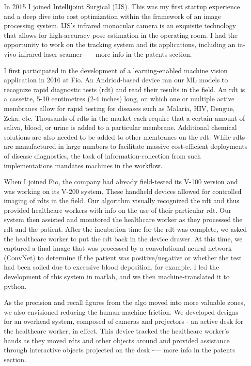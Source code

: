 \osspacing
In 2015 I joined Intellijoint Surgical (IJS). This was my first startup experience and a deep dive into cost optimization within the framework of an image processing system. IJS’s infrared monocular camera is an exquisite technology that allows for high-accuracy pose estimation in the operating room. I had the opportunity to work on the tracking system and its applications, including an in-vivo infrared laser scanner -— more info in the patents section.

\osspacing
I first participated in the development of a learning-enabled machine vision application in 2016 at Fio. An Andriod-based device ran our ML models to recognize rapid diagnostic tests (rdt) and read their results in the field. An rdt is a cassette, 5-10 centimetres (2-4 inches) long, on which one or multiple active membranes allow for rapid testing for diseases such as Malaria, HIV, Dengue, Zeka, etc. Thousands of rdts in the market each require that a certain amount of saliva, blood, or urine is added to a particular membrane. Additional chemical solutions are also needed to be added to other membranes on the rdt. While rdts are manufactured in large numbers to facilitate massive cost-efficient deployments of disease diagnostics, the task of information-collection from such implementations mandates machines in the workflow.

\osspacing
When I joined Fio, the company had already field-tested its V-100 version and was working on its V-200 system. These handheld devices allowed for controlled imaging of rdts in the field. Our algorithm visually recognized the rdt and thus provided healthcare workers with info on the use of their particular rdt. Our system then assisted and monitored the healthcare worker as they processed the rdt and the patient. After the incubation time for the rdt was complete, we asked the healthcare worker to put the rdt back in the device drawer. At this time, we captured a final image that was processed by a convolutional neural network (ConvNet) to determine if the patient was positive/negative or whether the test had been soiled due to excessive blood deposition, for example. I led the development of this system in matlab, and we then machine-translated it to python.
 
\osspacing
As the precision and recall figures from the algo moved into more valuable zones, we also envisioned reducing the human-machine friction. We developed designs for an overhead system, composed of cameras and projectors - an active desk for the healthcare worker, in effect. This device tracked the healthcare worker’s hands as they moved rdts and other objects around and provided assistance through interactive objects projected on the desk -— more info in the patents section.

